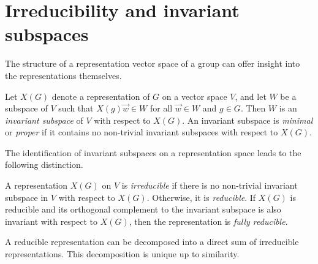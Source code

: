 \section{Irreducibility and invariant subspaces}

The structure of a representation vector space of a group can offer insight into the representations themselves.
\begin{definition}
    Let $X(G)$ denote a representation of $G$ on a vector space $V$, and let $W$ be a subspace of $V$ such that $X(g)\vec{w}\in W$ for all $\vec{w}\in W$ and $g\in G$. Then $W$ is an \textit{invariant subspace} of $V$ with respect to $X(G)$. An invariant subspace is \textit{minimal} or \textit{proper} if it contains no non-trivial invariant subspaces with respect to $X(G)$.
\end{definition}

The identification of invariant subspaces on a representation space leads to the following distinction.
\begin{definition}
    A representation $X(G)$ on $V$ is \textit{irreducible} if there is no non-trivial invariant subspace in $V$ with respect to $X(G)$. Otherwise, it is \textit{reducible}. If $X(G)$ is reducible and its orthogonal complement to the invariant subspace is also invariant with respect to $X(G)$, then the representation is \textit{fully reducible}.
\end{definition}

A reducible representation can be decomposed into a direct sum of irreducible representations. This decomposition is unique up to similarity.

